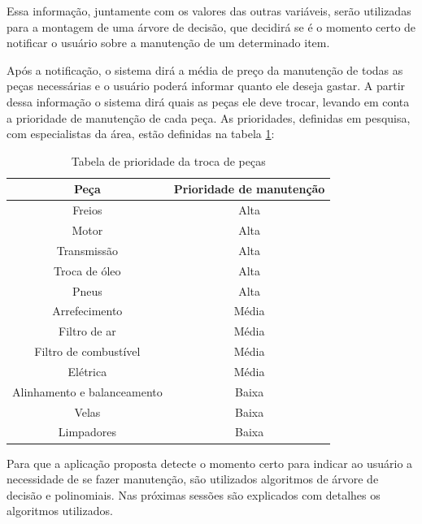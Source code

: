 \documentclass[12pt]{article}
\begin{document}
Essa informação, juntamente com os valores das outras variáveis, serão utilizadas
para a montagem de uma árvore de decisão, que decidirá se é o momento certo de
notificar o usuário sobre a manutenção de um determinado item.

Após a notificação, o sistema dirá a média de preço da manutenção de todas as
peças necessárias e o usuário poderá informar quanto ele deseja gastar. A partir
dessa informação o sistema dirá quais as peças ele deve trocar, levando em conta
a prioridade de manutenção de cada peça. As prioridades, definidas em pesquisa,
com especialistas da área, estão definidas na tabela \ref{tabela-prioridade}:

\begin{table}[h]
\centering
\begin{tabular}{|c|c|}
\hline
\textbf{Peça}               & \textbf{Prioridade de manutenção} \\ \hline
Freios                      & Alta                              \\ \hline
Motor                       & Alta                              \\ \hline
Transmissão                 & Alta                              \\ \hline
Troca de óleo               & Alta                              \\ \hline
Pneus                       & Alta                              \\ \hline
Arrefecimento               & Média                             \\ \hline
Filtro de ar                & Média                             \\ \hline
Filtro de combustível       & Média                             \\ \hline
Elétrica                    & Média                             \\ \hline
Alinhamento e balanceamento & Baixa                             \\ \hline
Velas                       & Baixa                             \\ \hline
Limpadores                  & Baixa                             \\ \hline
\end{tabular}
\caption{Tabela de prioridade da troca de peças}
\label{tabela-prioridade}
\end{table}

Para que a aplicação proposta detecte o momento certo para indicar ao usuário a
necessidade de se fazer manutenção, são utilizados algoritmos de árvore de
decisão e polinomiais. Nas próximas sessões são explicados com detalhes os
algoritmos utilizados.
\end{document}
